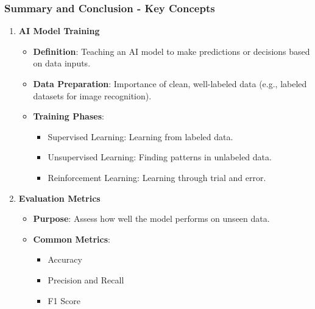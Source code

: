 \documentclass[aspectratio=169]{beamer}
\begin{document}
\begin{frame}[fragile]
    \frametitle{Summary and Conclusion - Key Concepts}
    \begin{enumerate}
        \item \textbf{AI Model Training}
        \begin{itemize}
            \item \textbf{Definition}: Teaching an AI model to make predictions or decisions based on data inputs.
            \item \textbf{Data Preparation}: Importance of clean, well-labeled data (e.g., labeled datasets for image recognition).
            \item \textbf{Training Phases}:
            \begin{itemize}
                \item Supervised Learning: Learning from labeled data.
                \item Unsupervised Learning: Finding patterns in unlabeled data.
                \item Reinforcement Learning: Learning through trial and error.
            \end{itemize}
        \end{itemize}

        \item \textbf{Evaluation Metrics}
        \begin{itemize}
            \item \textbf{Purpose}: Assess how well the model performs on unseen data.
            \item \textbf{Common Metrics}:
            \begin{itemize}
                \item Accuracy
                \item Precision and Recall
                \item F1 Score
            \end{itemize}
        \end{itemize}
    \end{enumerate}
\end{frame}
\end{document}
